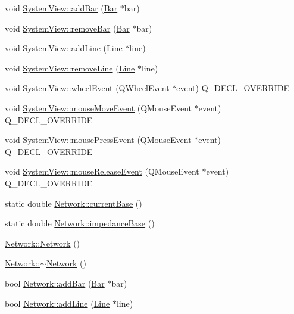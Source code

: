 \begin{DoxyCompactItemize}
void \hyperlink{group___graphics_gac4e02019d41c203c788ff1e6f3ee460e}{System\+View\+::add\+Bar} (\hyperlink{class_bar}{Bar} $\ast$bar)
\item 
void \hyperlink{group___graphics_ga1e96b08395a2f1b961dedbb3e8c99a50}{System\+View\+::remove\+Bar} (\hyperlink{class_bar}{Bar} $\ast$bar)
\item 
void \hyperlink{group___graphics_gaed2fb15d518cab9a52ea1ee258846bfc}{System\+View\+::add\+Line} (\hyperlink{class_line}{Line} $\ast$line)
\item 
void \hyperlink{group___graphics_ga4af1d763d9b9c02933e62d1f6231ad18}{System\+View\+::remove\+Line} (\hyperlink{class_line}{Line} $\ast$line)
\item 
void \hyperlink{group___graphics_gaab2fa6cebf9022eb6bf31497c0789675}{System\+View\+::wheel\+Event} (Q\+Wheel\+Event $\ast$event) Q\+\_\+\+D\+E\+C\+L\+\_\+\+O\+V\+E\+R\+R\+I\+D\+E
\item 
void \hyperlink{group___graphics_gab19e233cd697852dd71140971cb6e122}{System\+View\+::mouse\+Move\+Event} (Q\+Mouse\+Event $\ast$event) Q\+\_\+\+D\+E\+C\+L\+\_\+\+O\+V\+E\+R\+R\+I\+D\+E
\item 
void \hyperlink{group___graphics_ga42d4a485d6d9bd891d9505a5213cf783}{System\+View\+::mouse\+Press\+Event} (Q\+Mouse\+Event $\ast$event) Q\+\_\+\+D\+E\+C\+L\+\_\+\+O\+V\+E\+R\+R\+I\+D\+E
\item 
void \hyperlink{group___graphics_gaa8a2664405194bbe29daa454aead7416}{System\+View\+::mouse\+Release\+Event} (Q\+Mouse\+Event $\ast$event) Q\+\_\+\+D\+E\+C\+L\+\_\+\+O\+V\+E\+R\+R\+I\+D\+E
\item 
static double \hyperlink{group___graphics_ga433bc5c32cf2ce5329bb40b21952d885}{Network\+::current\+Base} ()
\item 
static double \hyperlink{group___graphics_gae6794c93d37df113778c37c2c702f6d9}{Network\+::impedance\+Base} ()
\item 
\hyperlink{group___graphics_ga3cc2fb4f8fa4d507077e8da85ce5a1c8}{Network\+::\+Network} ()
\item 
\hyperlink{group___graphics_ga7a4e19cdb4bf0c7ecf82baa643831492}{Network\+::$\sim$\+Network} ()
\item 
bool \hyperlink{group___graphics_ga8c5dfef0216731246f7411e1a5fbee01}{Network\+::add\+Bar} (\hyperlink{class_bar}{Bar} $\ast$bar)
\item 
bool \hyperlink{group___graphics_gae02945131494987b3ff9b59b627719b4}{Network\+::add\+Line} (\hyperlink{class_line}{Line} $\ast$line)
\item 

\end{DoxyCompactItemize}
